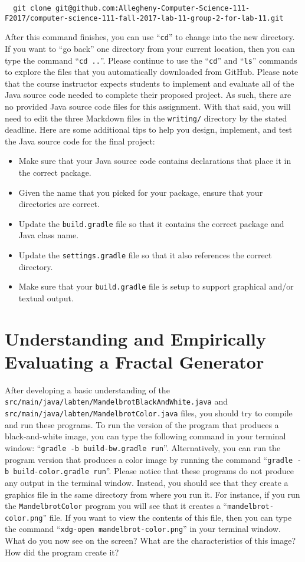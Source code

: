 \documentclass[11pt]{article}
\newcommand{\mainprogramsource}{\lstinline{src/main/java/labten/MandelbrotBlackAndWhite.java}}
\newcommand{\secondprogram}{\lstinline{MandelbrotColor}}
\newcommand{\secondprogramsource}{\lstinline{src/main/java/labten/MandelbrotColor.java}}
\newcommand{\command}[1]{``\lstinline{#1}''}
\newcommand{\program}[1]{\lstinline{#1}}
\newcommand{\step}[1]{``{#1}''}
\begin{document}
\begin{lstlisting}
  git clone git@github.com:Allegheny-Computer-Science-111-F2017/computer-science-111-fall-2017-lab-11-group-2-for-lab-11.git
\end{lstlisting}

After this command finishes, you can use \command{cd} to change into the new directory. If you want to \step{go back}
one directory from your current location, then you can type the command \command{cd ..}. Please continue to use the
\command{cd} and \command{ls} commands to explore the files that you automatically downloaded from GitHub. Please note
that the course instructor expects students to implement and evaluate all of the Java source code needed to complete
their proposed project. As such, there are no provided Java source code files for this assignment. With that said, you
will need to edit the three Markdown files in the \program{writing/} directory by the stated deadline. Here are some
additional tips to help you design, implement, and test the Java source code for the final project:

\begin{itemize}
  \item Make sure that your Java source code contains declarations that place it in the correct package.
  \item Given the name that you picked for your package, ensure that your directories are correct.
  \item Update the \program{build.gradle} file so that it contains the correct package and Java class name.
  \item Update the \program{settings.gradle} file so that it also references the correct directory.
  \item Make sure that your \program{build.gradle} file is setup to support graphical and/or textual output.
\end{itemize}

\section*{Understanding and Empirically Evaluating a Fractal Generator}

After developing a basic understanding of the \mainprogramsource{} and \secondprogramsource{} files, you should try to
compile and run these programs. To run the version of the program that produces a black-and-white image, you can type
the following command in your terminal window: \command{gradle -b build-bw.gradle run}. Alternatively, you can run the
program version that produces a color image by running the command \command{gradle -b build-color.gradle run}. Please
notice that these programs do not produce any output in the terminal window. Instead, you should see that they create a
graphics file in the same directory from where you run it. For instance, if you run the \secondprogram{} program you
will see that it creates a \command{mandelbrot-color.png} file. If you want to view the contents of this file, then you
can type the command \command{xdg-open mandelbrot-color.png} in your terminal window. What do you now see on the screen?
What are the characteristics of this image? How did the program create it?
\end{document}
